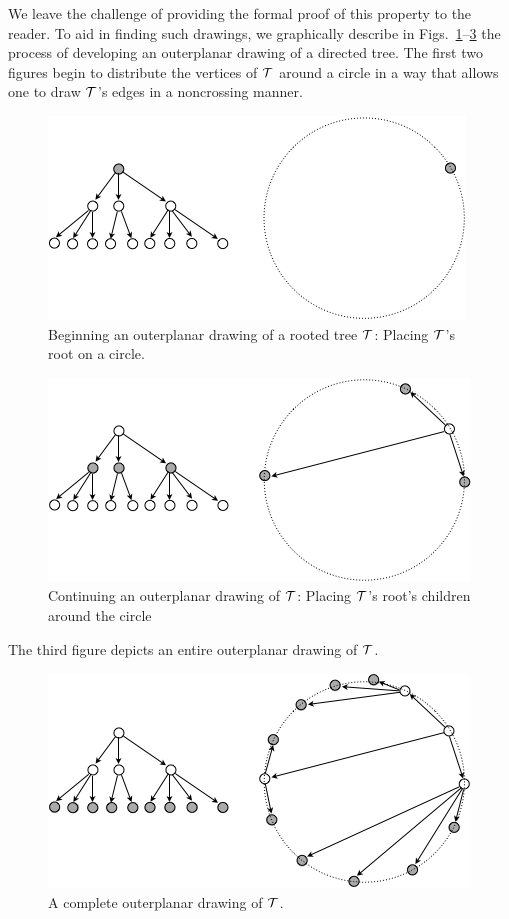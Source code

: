 We leave the challenge of providing the formal proof of this property to the reader.   To aid in finding such drawings, we graphically describe in Figs.~\ref{fig:treeoutplanar1}--\ref{fig:treeoutplanar3} the process of developing an outerplanar drawing of a directed tree.  The first two figures begin to distribute the vertices of $\mbox{$\cal T$}$ around a circle in a way that allows one to draw $\mbox{$\cal T$}$'s edges in a noncrossing manner.
\begin{figure}[hbt]
\begin{center}
       \includegraphics[scale=0.45]{FiguresGraph/TreeOutplanar1}
       \caption{Beginning an outerplanar drawing of a rooted tree $\mbox{$\cal T$}$: Placing $\mbox{$\cal T$}$'s root on a circle.}
  \label{fig:treeoutplanar1}
\end{center}
\end{figure}
\begin{figure}[hbt]
\begin{center}
       \includegraphics[scale=0.45]{FiguresGraph/TreeOutplanar2}
       \caption{Continuing an outerplanar drawing of $\mbox{$\cal T$}$: Placing $\mbox{$\cal T$}$'s root's children around the circle}
  \label{fig:treeoutplanar2}
\end{center}
\end{figure}
The third figure depicts an entire outerplanar drawing of $\mbox{$\cal T$}$.
\begin{figure}[hbt]
\begin{center}
       \includegraphics[scale=0.45]{FiguresGraph/TreeOutplanar3}
       \caption{A complete outerplanar drawing of $\mbox{$\cal T$}$.}
  \label{fig:treeoutplanar3}
\end{center}
\end{figure}

